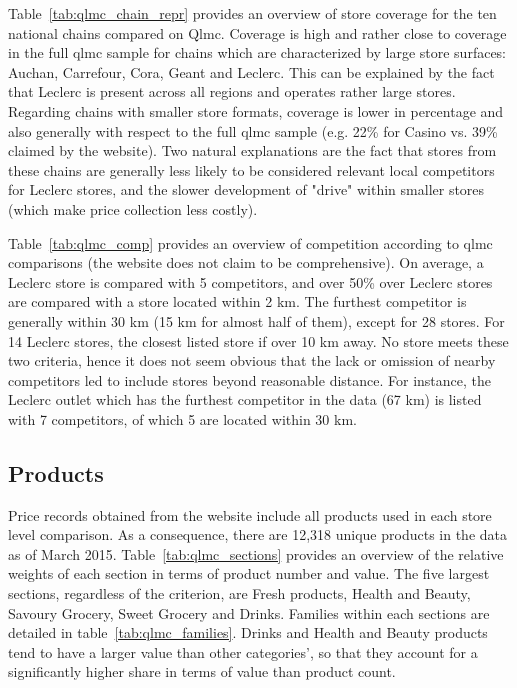 \documentclass[english]{article}
\begin{document}
Table~\ref{tab:qlmc_chain_repr} provides an overview of store coverage for the ten national chains compared on Qlmc. Coverage is high and rather close to coverage in the full qlmc sample for chains which are characterized by large store surfaces: Auchan, Carrefour, Cora, Geant and Leclerc. This can be explained by the fact that Leclerc is present across all regions and operates rather large stores. Regarding chains with smaller store formats, coverage is lower in percentage and also generally with respect to the full qlmc sample (e.g. 22\% for Casino vs. 39\% claimed by the website). Two natural explanations are the fact that stores from these chains are generally less likely to be considered relevant local competitors for Leclerc stores, and the slower development of "drive" within smaller stores (which make price collection less costly).

Table~\ref{tab:qlmc_comp} provides an overview of competition according to qlmc comparisons (the website does not claim to be comprehensive). On average, a Leclerc store is compared with 5 competitors, and over 50\% over Leclerc stores are compared with a store located within 2 km. The furthest competitor is generally within 30 km (15 km for almost half of them), except for 28 stores. For 14 Leclerc stores, the closest listed store if over 10 km away. No store meets these two criteria, hence it does not seem obvious that the lack or omission of nearby competitors led to include stores beyond reasonable distance. For instance, the Leclerc outlet which has the furthest competitor in the data (67 km) is listed with 7 competitors, of which 5 are located within 30 km.

\subsection{Products}

Price records obtained from the website include all products used in each store level comparison. As a consequence, there are 12,318 unique products in the data as of March 2015. Table~\ref{tab:qlmc_sections} provides an overview of the relative weights of each section in terms of product number and value. The five largest sections, regardless of the criterion, are Fresh products, Health and Beauty, Savoury Grocery, Sweet Grocery and Drinks. Families within each sections are detailed in table~\ref{tab:qlmc_families}. Drinks and Health and Beauty products tend to have a larger value than other categories', so that they account for a significantly higher share in terms of value than product count.
\end{document}
